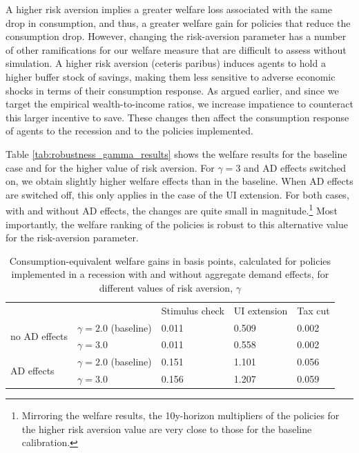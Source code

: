 \documentclass[\econtexRoot/HAFiscal]{subfiles}
\begin{document}
A higher risk aversion implies a greater welfare loss associated with the same drop in consumption, and thus, a greater welfare gain for policies that reduce the consumption drop.
However, changing the risk-aversion parameter has a number of other ramifications for our welfare measure that are difficult to assess without simulation.
A higher risk aversion (ceteris paribus) induces agents to hold a higher buffer stock of savings, making them less sensitive to adverse economic shocks in terms of their consumption response.
As argued earlier, and since we target the empirical wealth-to-income ratios, we increase impatience to counteract this larger incentive to save.
These changes then affect the consumption response of agents to the recession and to the policies implemented.


Table \ref{tab:robustness_gamma_results} shows the welfare results for the baseline case and for the higher value of risk aversion.
For $\gamma=3$ and AD effects switched on, we obtain slightly higher welfare effects than in the baseline.
When AD effects are switched off, this only applies in the case of the UI extension.
For both cases, with and without AD effects, the changes are quite small in magnitude.\footnote{Mirroring the welfare results, the 10y-horizon multipliers of the policies for the higher risk aversion value are very close to those for the baseline calibration.} Most importantly, the welfare ranking of the policies is robust to this alternative value for the risk-aversion parameter.

\begin{table}[]
  \begin{center}
    \begin{tabular}{@{}lllll@{}}
      \toprule
      &                    & Stimulus check & UI extension & Tax cut \\ \cmidrule(l){1-5} 
      \multirow{2}{*}{no AD effects}
      & $\gamma = 2.0$ (baseline) & 0.011          & 0.509        & 0.002   \\
      & $\gamma = 3.0$ 			& 0.011          & 0.558        & 0.002   \\ \cmidrule(l){1-5} 
      \multirow{2}{*}{AD effects}
      & $\gamma = 2.0$ (baseline) & 0.151          & 1.101        & 0.056   \\
      & $\gamma = 3.0$    		& 0.156          & 1.207        & 0.059   \\ \cmidrule(l){1-5} 
    \end{tabular}
    \caption{Consumption-equivalent welfare gains in basis points, calculated for policies implemented in a recession with and without aggregate demand effects, for different values of risk aversion, $\gamma$}
    \notinsubfile{\label{tab:robustness_gamma_results}}
  \end{center}
\end{table}
\end{document}

